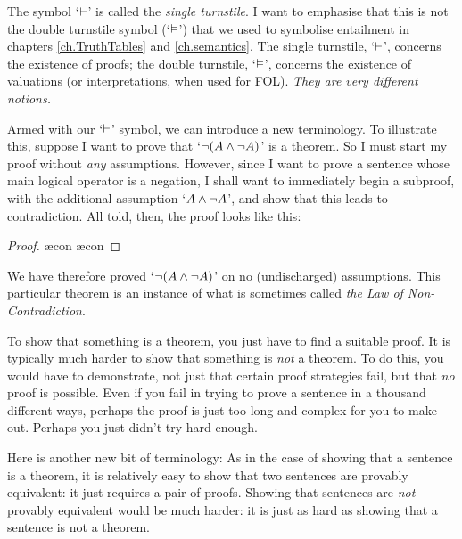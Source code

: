 The symbol `$\vdash$' is called the \emph{single turnstile}. I want to emphasise that this is not the {double turnstile} symbol (`$\vDash$') that we used to symbolise entailment in chapters \ref{ch.TruthTables} and \ref{ch.semantics}. The single turnstile, `$\vdash$', concerns the existence of proofs; the double turnstile, `$\vDash$', concerns the existence of valuations (or interpretations, when used for FOL). \emph{They are very different notions.}

Armed with our `$\vdash$' symbol, we can introduce a new terminology.
To illustrate this, suppose I want to prove that `$\neg (A \wedge \neg A)$' is a theorem. So I must start my proof without \emph{any} assumptions. However, since I want to prove a sentence whose main logical operator is a negation, I shall want to  immediately begin a subproof, with the additional assumption `$A \wedge \neg A$', and show that this leads to contradiction. All told, then, the proof looks like this:
	\begin{proof}
		\open
			\ae{con}
			\ae{con}
		\close
	\end{proof}
We have therefore proved `$\neg (A \wedge \neg A)$' on no (undischarged) assumptions. This particular theorem is an instance of what is sometimes called \emph{the Law of Non-Contradiction}.

To show that something is a theorem, you just have to find a suitable proof. It is typically much harder to show that something is \emph{not} a theorem. To do this, you would have to demonstrate, not just that certain proof strategies fail, but that \emph{no} proof is possible. Even if you fail in trying to prove a sentence in a thousand different ways, perhaps the proof is just too long and complex for you to make out. Perhaps you just didn't try hard enough.

Here is another new bit of terminology:
As in the case of showing that a sentence is a theorem, it is relatively easy to show that two sentences are provably equivalent: it just requires a pair of proofs. Showing that sentences are \emph{not} provably equivalent would be much harder: it is just as hard as showing that a sentence is not a theorem. 

